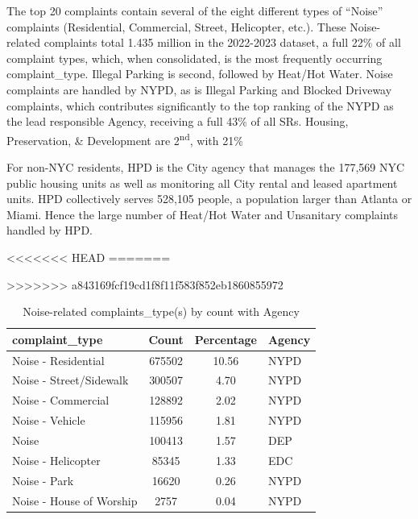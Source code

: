 \documentclass[12pt, titlepage]{article}
\begin{document}
The top 20 complaints contain several of the eight different types of ``Noise'' 
complaints (Residential, Commercial, Street, Helicopter, etc.). These Noise-related
complaints total 1.435 million in the 2022-2023 dataset, a full 22\% of 
all complaint types, which, when consolidated, is the most frequently occurring complaint\_type.
Illegal Parking is second, followed by Heat/Hot Water. Noise complaints 
are handled by NYPD, as is Illegal Parking and Blocked Driveway complaints, 
which contributes significantly to the top ranking of the NYPD as the lead 
responsible Agency, receiving a full 43\% of all SRs. 
Housing, Preservation, \& Development are 2\textsuperscript{nd}, with 21\%

For  non-NYC residents, HPD is the City agency that manages the 
177,569 NYC public housing units as well as monitoring
all City rental and leased apartment units. HPD collectively serves 
528,105 people, a population larger than Atlanta or Miami. 
Hence the large number of Heat/Hot Water and Unsanitary complaints 
handled by HPD. 

<<<<<<< HEAD
=======


>>>>>>> a843169fcf19cd1f8f11f583f852eb1860855972
\begin{table}[tbp]
    \centering
    \caption{Noise-related complaints\_type(s) by count with Agency}
	    \begin{tabular}{@{}lS[table-format=7.0,round-mode=places,
	    round-precision=0]S[table-format=2.2,round-mode=places,
	    round-precision=2]l@{}} %
	        \toprule
	        \textbf{complaint\_type} & \textbf{Count} & \textbf{Percentage} & \textbf{Agency} \\ 
	        \midrule
	        Noise - Residential        & 675502 & 10.56 & NYPD  \\ 
	        Noise - Street/Sidewalk    & 300507 &  4.70 & NYPD  \\ 
	        Noise - Commercial         & 128892 &  2.02 & NYPD  \\ 
	        Noise - Vehicle            & 115956 &  1.81 & NYPD  \\ 
	        Noise                      & 100413 &  1.57 & DEP   \\ 
	        Noise - Helicopter         &  85345 &  1.33 & EDC   \\ 
	        Noise - Park               &  16620 &  0.26 & NYPD  \\ 
	        Noise - House of Worship &   2757 &  0.04 & NYPD  \\ 
	        \bottomrule
	    \end{tabular}
    \label{tab:noisecomplaints}
\end{table}
\end{document}
